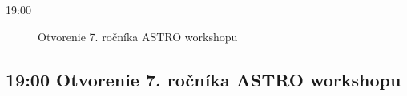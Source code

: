 \documentclass[a4paper]{report}
\begin{document}
        \begin{description}
                            \item[19:00]
                    {\Large Otvorenie 7. ročníka ASTRO workshopu} \\[1ex]
                                                                                
                    \end{description}


                                    \begin{tcolorbox}
                            \subsection{19:00 \hfill Otvorenie 7. ročníka ASTRO workshopu}
                                                            \end{tcolorbox}
                                \section{\color[rgb]{0, 0.1, 0.4}{piatok}}
\end{document}
